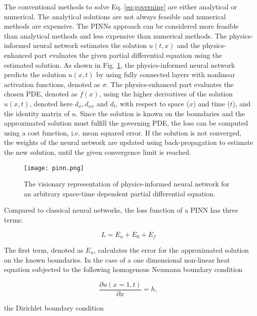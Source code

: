 The conventional methods to solve Eq. \ref{eq:governing} are either analytical or numerical. The analytical solutions are 
not always feasible and numerical methods are expensive. The PINNs approach can be considered more feasible than analytical
methods and less expensive than numerical methods. 
The physics-informed neural network estimates the solution $u(t,x)$ and the physics-enhanced part evaluates
the given partial differential equation using the estimated solution. As shown in Fig. \ref{fig:pinn_arch}, the physics-informed
neural network predicts the solution $u(x,t)$ by using fully connected layers with nonlinear activation functions,
denoted as $\sigma$. The physics-enhanced part evaluates the chosen PDE, denoted as $f(x)$, using the higher derivatives
of the solution $u(x,t)$, denoted here $d_{x}, d_{xx}$ and $d_{t}$, with respect to space ($x$) and time ($t$), and the identity 
matrix of $u$. Since the solution is known on the boundaries and the approximated solution must fulfill the governing PDE, the loss
can be computed using a cost function, i.e. mean squared error. If the solution is not converged, the weights of the neural network
are updated using back-propagation to estimate the new solution, until the given convergence limit is reached. 


\begin{figure}[thbp]
    \centering
    \texttt{[image: pinn.png]}  
    \caption{The visionary representation of physics-informed neural network for an arbitrary space-time dependent partial
    differential equation. }
    \label{fig:pinn_arch}
\end{figure}

Compared to classical neural networks, the loss function of a PINN has three terms:

\begin{equation}
    \label{eq:total_loss_compact}
    L = E_{u} +  E_{0} + E_{f}
\end{equation}

\noindent The first term, denoted as $E_{u}$, calculates the error for the approximated solution on the known
boundaries. In the case of a one dimensional non-linear heat equation subjected to the following 
homogenous Neumann boundary condition

\begin{equation}
    \label{eq:neumann}
    \frac{\partial u(x=1, t)}{\partial x}=h,
\end{equation}

\noindent the Dirichlet boundary condition

